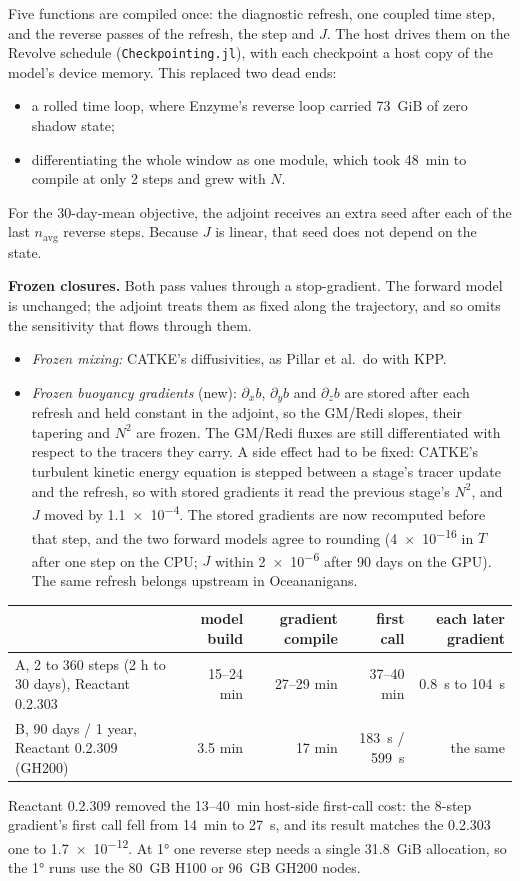 \documentclass[10pt]{article}
\begin{document}
Five functions are compiled once: the diagnostic refresh, one coupled time step, and the reverse passes of the
refresh, the step and $J$. The host drives them on the Revolve schedule (\texttt{Checkpointing.jl}), with each
checkpoint a host copy of the model's device memory. This replaced two dead ends:
\begin{itemize}
  \item a rolled time loop, where Enzyme's reverse loop carried \SI{73}{GiB} of zero shadow state;
  \item differentiating the whole window as one module, which took \SI{48}{min} to compile at only 2 steps and
        grew with $N$.
\end{itemize}
For the 30-day-mean objective, the adjoint receives an extra seed after each of the last $n_{\text{avg}}$ reverse
steps. Because $J$ is linear, that seed does not depend on the state.

\textbf{Frozen closures.} Both pass values through a stop-gradient. The forward model is unchanged; the adjoint
treats them as fixed along the trajectory, and so omits the sensitivity that flows through them.
\begin{itemize}
  \item \emph{Frozen mixing:} CATKE's diffusivities, as Pillar et al.\ do with KPP.
  \item \emph{Frozen buoyancy gradients} (new): $\partial_x b$, $\partial_y b$ and $\partial_z b$ are stored after each
        refresh and held constant in the adjoint, so the GM/Redi slopes, their tapering and $N^2$ are frozen. The
        GM/Redi fluxes are still differentiated with respect to the tracers they carry. A side effect had to be
        fixed: CATKE's turbulent kinetic energy equation is stepped between a stage's tracer update and the
        refresh, so with stored gradients it read the previous stage's $N^2$, and $J$ moved by \num{1.1e-4}. The
        stored gradients are now recomputed before that step, and the two forward models agree to rounding
        (\num{4e-16} in $T$ after one step on the CPU; $J$ within \num{2e-6} after 90 days on the GPU). The same
        refresh belongs upstream in Oceananigans.
\end{itemize}

\begin{center}\small
\begin{tabular}{@{}lrrrr@{}}
\toprule
& model build & gradient compile & first call & each later gradient \\
\midrule
A, 2 to 360 steps (2 h to 30 days), Reactant 0.2.303 & 15--24 min & 27--29 min & 37--40 min & \SI{0.8}{s} to \SI{104}{s} \\
B, 90 days / 1 year, Reactant 0.2.309 (GH200) & 3.5 min & 17 min & \SI{183}{s} / \SI{599}{s} & the same \\
\bottomrule
\end{tabular}
\end{center}
Reactant 0.2.309 removed the 13--\SI{40}{min} host-side first-call cost: the 8-step gradient's first call fell from
\SI{14}{min} to \SI{27}{s}, and its result matches the 0.2.303 one to \num{1.7e-12}. At \ang{1} one reverse step
needs a single \SI{31.8}{GiB} allocation, so the \ang{1} runs use the \SI{80}{GB} H100 or \SI{96}{GB} GH200 nodes.
\end{document}
